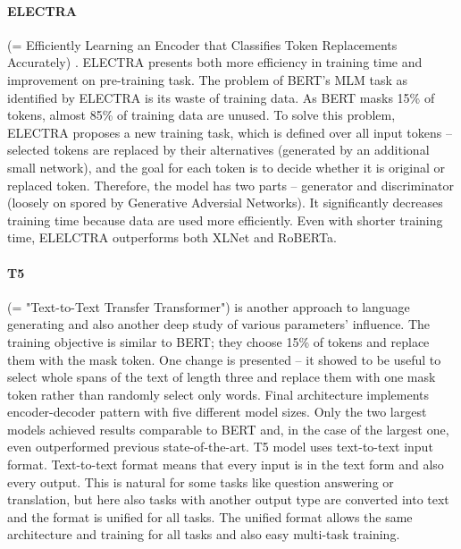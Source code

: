 \paragraph{ELECTRA} (= Efficiently Learning an Encoder that Classifies Token Replacements Accurately) \citep{Clark2020}. ELECTRA presents both more efficiency in training time and improvement on pre-training task. The problem of BERT's MLM task as identified by ELECTRA is its waste of training data. As BERT masks 15\% of tokens, almost 85\% of training data are unused. To solve this problem, ELECTRA proposes a new training task, which is defined over all input tokens -- selected tokens are replaced by their alternatives (generated by an additional small network), and the goal for each token is to decide whether it is original or replaced token. Therefore, the model has two parts -- generator and discriminator (loosely on spored by Generative Adversial Networks). It significantly decreases training time because data are used more efficiently. Even with shorter training time, ELELCTRA outperforms both XLNet and RoBERTa.
\paragraph{T5} (= "Text-to-Text Transfer Transformer") \citep{Raffel2019a} is another approach to language generating and also another deep study of various parameters' influence. The training objective is similar to BERT; they choose 15\% of tokens and replace them with the mask token. One change is presented -- it showed to be useful to select whole spans of the text of length three and replace them with one mask token rather than randomly select only words. Final architecture implements encoder-decoder pattern with five different model sizes. Only the two largest models achieved results comparable to BERT and, in the case of the largest one, even outperformed previous state-of-the-art. T5 model uses text-to-text input format. Text-to-text format means that every input is in the text form and also every output. This is natural for some tasks like question answering or translation, but here also tasks with another output type are converted into text and the format is unified for all tasks. The unified format allows the same architecture and training for all tasks and also easy multi-task training.  
